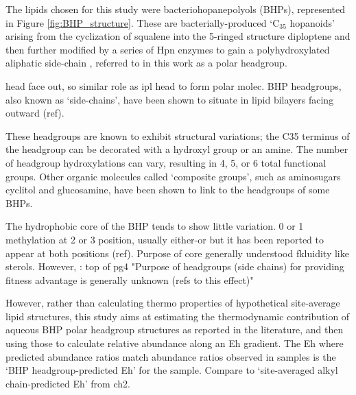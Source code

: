 The lipids chosen for this study were bacteriohopanepolyols (BHPs), represented in Figure \ref{fig:BHP_structure}. These are bacterially-produced `C$_{35}$ hopanoids' arising from the cyclization of squalene into the 5-ringed structure diploptene and then further modified by a series of Hpn enzymes to gain a polyhydroxylated aliphatic side-chain \citep{belin2018hopanoid, welander2012identification}, referred to in this work as a polar headgroup.

head face out, so similar role as ipl head to form polar molec. BHP headgroups, also known as `side-chains', have been shown to situate in lipid bilayers facing outward (ref).



These headgroups are known to exhibit structural variations; the C35 terminus of the headgroup can be decorated with a hydroxyl group or an amine. The number of headgroup hydroxylations can vary, resulting in 4, 5, or 6 total functional groups. Other organic molecules called `composite groups', such as aminosugars cyclitol and glucosamine, have been shown to link to the headgroups of some BHPs. 

The hydrophobic core of the BHP tends to show little variation. 0 or 1 methylation at 2 or 3 position, usually either-or but it has been reported to appear at both positions (ref). Purpose of core generally understood fkluidity like sterols. However, \citep{belin2018hopanoid}: top of pg4 "Purpose of headgroups (side chains) for providing fitness advantage is generally unknown (refs to this effect)"







However, rather than calculating thermo properties of hypothetical site-average lipid structures, this study aims at estimating the thermodynamic contribution of aqueous BHP polar headgroup structures as reported in the literature, and then using those to calculate relative abundance along an Eh gradient. The Eh where predicted abundance ratios match abundance ratios observed in samples is the `BHP headgroup-predicted Eh' for the sample. Compare to `site-averaged alkyl chain-predicted Eh' from ch2.

